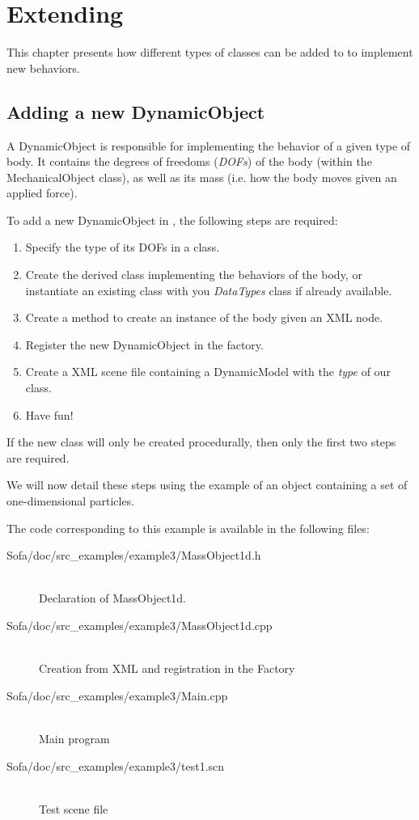 \chapter{Extending \sofa}\label{chapter:es}

This chapter presents how different types of classes can be added to \sofa{} to implement new behaviors.

\section{Adding a new DynamicObject}

A DynamicObject is responsible for implementing the behavior of a given type of body. It contains the degrees of freedoms (\textit{DOFs}) of the body (within the MechanicalObject class), as well as its mass (i.e. how the body moves given an applied force).

To add a new DynamicObject in \sofa, the following steps are required:

\begin{enumerate}
\item Specify the type of its DOFs in a  class.
\item Create the  derived class implementing the behaviors of the body, or instantiate an existing class with you \textit{DataTypes} class if already available.
\item Create a method to create an instance of the body given an XML node.
\item Register the new DynamicObject in the  factory.
\item Create a XML scene file containing a DynamicModel with the \textit{type} of our class.
\item Have fun!
\end{enumerate}

If the new class will only be created procedurally, then only the first two steps are required.

We will now detail these steps using the example of an object containing a set of one-dimensional particles.

The code corresponding to this example is available in the following files:
\begin{description}
\item[Sofa/doc/src\_examples/example3/MassObject1d.h]~\\
 Declaration of MassObject1d.
\item[Sofa/doc/src\_examples/example3/MassObject1d.cpp]~\\
 Creation from XML and registration in the Factory
\item[Sofa/doc/src\_examples/example3/Main.cpp]~\\
 Main program
\item[Sofa/doc/src\_examples/example3/test1.scn]~\\
 Test scene file
\end{description}

